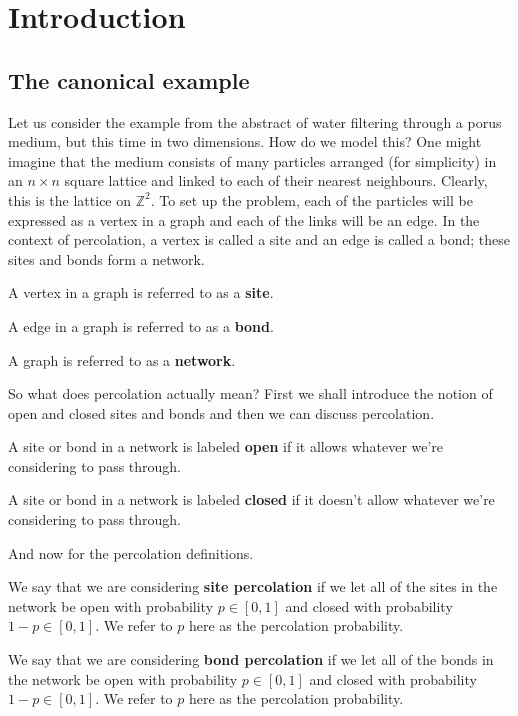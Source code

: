 \section{Introduction}
\subsection{The canonical example}
Let us consider the example from the abstract of water filtering through a porus medium, but this time in two dimensions. How do we model this? One might imagine that the medium consists of
many particles arranged (for simplicity) in an $n \times n$ square lattice and linked to each of their nearest neighbours. Clearly, this is the lattice on $\mathbb{Z}^2$.
To set up the problem, each of the particles will be expressed as a vertex in a graph and each of the links will be an edge. In the context of percolation, a vertex is called a site and an edge is
called a bond; these sites and bonds form a network.

\begin{definition}\label{def:site}
  A vertex in a graph is referred to as a \textbf{site}.
\end{definition}

\begin{definition}\label{def:bond}
  A edge in a graph is referred to as a \textbf{bond}.
\end{definition}

\begin{definition}\label{def:network}
  A graph is referred to as a \textbf{network}.
\end{definition}


So what does percolation actually mean? First we shall introduce the notion of open and closed sites and bonds and then we can discuss percolation.

\begin{definition}\label{def:open}
  A site or bond in a network is labeled \textbf{open} if it allows whatever we're considering to pass through.
\end{definition}

\begin{definition}\label{def:closed}
  A site or bond in a network is labeled \textbf{closed} if it doesn't allow whatever we're considering to pass through.
\end{definition}

And now for the percolation definitions.

\begin{definition}\label{def:site percolation}
  We say that we are considering \textbf{site percolation} if we let all of the sites in the network be open with probability $p \in [0, 1]$ and closed with probability $1-p \in
  [0, 1]$. We refer to $p$ here as the percolation probability.
\end{definition}
\begin{definition}\label{def:bond percolation}
  We say that we are considering \textbf{bond percolation} if we let all of the bonds in the network be open with probability $p \in [0, 1]$ and closed with probability $1-p \in
  [0, 1]$. We refer to $p$ here as the percolation probability.
\end{definition}

